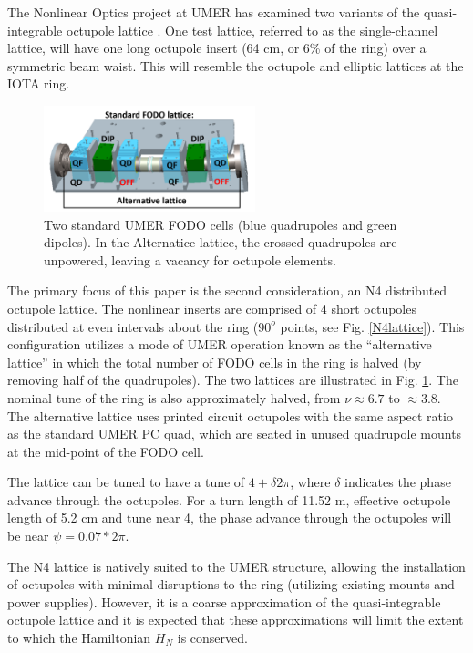 The Nonlinear Optics project at UMER has examined two variants of the quasi-integrable octupole lattice \cite{DN}.  One test lattice, referred to as the single-channel lattice, will have one long octupole insert (64 cm, or 6\% of the ring) over a symmetric beam waist. \cite{KRAAC} This will resemble the octupole and elliptic lattices at the IOTA ring.


\begin{figure}[!htb]
   \centering
   \includegraphics*[width=174pt]{6.figures/UMER_FODO}
   \caption{Two standard UMER FODO cells (blue quadrupoles and green dipoles). In the Alternatice lattice, the crossed quadrupoles are unpowered, leaving a vacancy for octupole elements.}
   \label{FODOcell}
\end{figure}

The primary focus of this paper is the second consideration, an N4 distributed octupole lattice. The nonlinear inserts are comprised of 4 short octupoles distributed at even intervals about the ring ($90^o$ points, see Fig. \ref{N4lattice}). This configuration utilizes a mode of UMER operation known as the “alternative lattice” in which the total number of FODO cells in the ring is halved (by removing half of the quadrupoles).  The two lattices are illustrated in Fig. \ref{FODOcell}. The nominal tune of the ring is also approximately halved, from $\nu \approx 6.7$ to $\approx 3.8$. The alternative lattice uses printed circuit octupoles with the same aspect ratio as the standard UMER PC quad, which are seated in unused quadrupole mounts at the mid-point of the FODO cell. 


The lattice can be tuned to have a tune of $4+\delta 2\pi$, where $\delta$ indicates the phase advance through the octupoles. For a turn length of 11.52 m, effective octupole length of 5.2 cm and tune near 4, the phase advance through the octupoles will be near $\psi = 0.07 *2\pi$. 

The N4 lattice is natively suited to the UMER structure, allowing the installation of octupoles with minimal disruptions to the ring (utilizing existing mounts and power supplies). However, it is a coarse approximation of the quasi-integrable octupole lattice and it is expected that these approximations will limit the extent to which the Hamiltonian $H_N$ is conserved.

